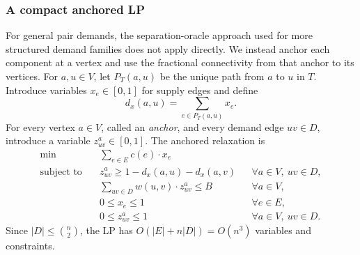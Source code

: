 \subsubsection{A compact anchored LP}

For general pair demands, the separation-oracle approach used for more structured demand families does not apply directly. We instead anchor each component at a vertex and use the fractional connectivity from that anchor to its vertices.
For $a,u\in V$, let $P_T(a,u)$ be the unique path from $a$ to $u$ in $T$. Introduce variables $x_e\in[0,1]$ for supply edges and define
\[
    d_x(a,u)=\sum_{e\in P_T(a,u)}x_e.
\]
For every vertex $a\in V$, called an \emph{anchor}, and every demand edge $uv\in D$, introduce a variable $z^a_{uv}\in[0,1]$. The anchored relaxation is
\begin{equation}\label{lp:tree-anchored}
\begin{aligned}
    \min\quad
        &\sum_{e\in E}c(e)\cdot x_e\\
    \text{subject to}\quad
        &z^a_{uv}\geq1-d_x(a,u)-d_x(a,v)
            &&\forall a\in V,\ uv\in D,\\
        &\sum_{uv\in D}w(u,v)\cdot z^a_{uv}\leq B
            &&\forall a\in V,\\
        &0\leq x_e\leq1
            &&\forall e\in E,\\
        &0\leq z^a_{uv}\leq1
            &&\forall a\in V,\ uv\in D.
\end{aligned}
\end{equation}
Since $|D|\leq\binom{n}{2}$, the LP has $O(|E|+n|D|)=O(n^3)$ variables and constraints.

